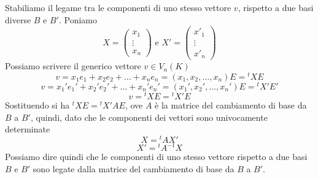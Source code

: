 Stabiliamo il legame tra le componenti di uno stesso vettore \(v\), rispetto a due basi diverse \(B\) e \(B'\). Poniamo \[
X = \begin{pmatrix} x_1\\ \vdots\\ x_n \end{pmatrix} \text{ e } X'=\begin{pmatrix} x'_1\\ \vdots\\ x'_n \end{pmatrix}
\] Possiamo scrivere il generico vettore \(v \in V_n(K)\) \[
v = x_1e_1+x_2e_2 + \ldots + x_n e_n = (x_1,x_2, \ldots , x_n)E= {^{t}X}E \] \[
v = x_1'e_1'+x_2'e_2' + \ldots + x_n' e_n' = (x_1',x_2', \ldots , x_n')E= {^{t}X'}E'
\] \[
v = {^{t}X}E = {^{t}X'}E
\] Sostituendo si ha \({^{t}X}E = {^tX'}AE\), ove \(A\) è la matrice del cambiamento di base da \(B\) a \(B'\), quindi, dato che le componenti dei vettori sono univocamente determinate \[
X = {^tA}X'
\] \[
X' = {^tA^{-1}}X
\] Possiamo dire quindi che le componenti di uno stesso vettore rispetto a due basi \(B\) e \(B'\) sono legate dalla matrice del cambiamento di base da \(B\) a \(B'\).

